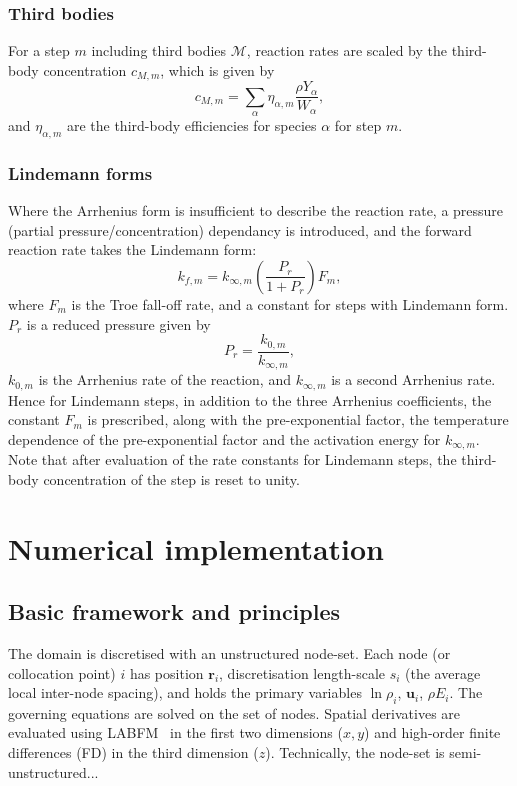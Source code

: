 \documentclass[notitlepage]{revtex4-1}
\begin{document}
\subsubsection{Third bodies}

For a step $m$ including third bodies $\mathcal{M}$, reaction rates are scaled by the third-body concentration $c_{M,m}$, which is given by
\begin{equation}c_{M,m}=\displaystyle\sum_{\alpha}\eta_{\alpha,m}\frac{\rho{Y}_{\alpha}}{W_{\alpha}},\end{equation}
and $\eta_{\alpha,m}$ are the third-body efficiencies for species $\alpha$ for step $m$.

\subsubsection{Lindemann forms}

Where the Arrhenius form is insufficient to describe the reaction rate, a pressure (partial pressure/concentration) dependancy is introduced, and the forward reaction rate takes the Lindemann form:
\begin{equation}k_{f,m}=k_{\infty,m}\left(\frac{P_{r}}{1+P_{r}}\right)F_{m},\end{equation}
where $F_{m}$ is the Troe fall-off rate, and a constant for steps with Lindemann form. $P_{r}$ is a reduced pressure given by
\begin{equation}P_{r}=\frac{k_{0,m}}{k_{\infty,m}},\end{equation}
$k_{0,m}$ is the Arrhenius rate of the reaction, and $k_{\infty,m}$ is a second Arrhenius rate. Hence for Lindemann steps, in addition to the three Arrhenius coefficients, the constant $F_{m}$ is prescribed, along with the pre-exponential factor, the temperature dependence of the pre-exponential factor and the activation energy for $k_{\infty,m}$. Note that after evaluation of the rate constants for Lindemann steps, the third-body concentration of the step is reset to unity.

\section{Numerical implementation}

\subsection{Basic framework and principles}

The domain is discretised with an unstructured node-set. Each node (or collocation point) $i$ has position $\bm{r}_{i}$, discretisation length-scale $s_{i}$ (the average local inter-node spacing), and holds the primary variables $\ln\rho_{i}$, $\bm{u}_{i}$, $\rho{E}_{i}$. The governing equations are solved on the set of nodes. Spatial derivatives are evaluated using LABFM~\cite{king_labfm_2022} in the first two dimensions ($x,y$) and high-order finite differences (FD) in the third dimension ($z$). Technically, the node-set is semi-unstructured...
\end{document}

